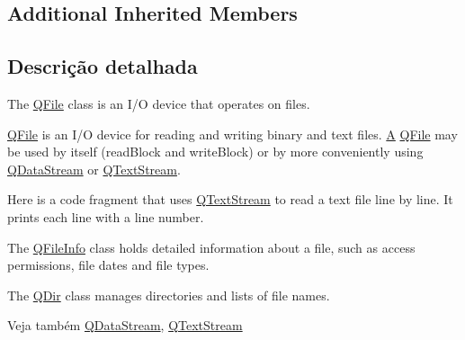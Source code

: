 \subsection*{Additional Inherited Members}


\subsection{Descrição detalhada}
The \hyperlink{class_q_file}{Q\-File} class is an I/\-O device that operates on files. 

\hyperlink{class_q_file}{Q\-File} is an I/\-O device for reading and writing binary and text files. \hyperlink{class_a}{A} \hyperlink{class_q_file}{Q\-File} may be used by itself (read\-Block and write\-Block) or by more conveniently using \hyperlink{class_q_data_stream}{Q\-Data\-Stream} or \hyperlink{class_q_text_stream}{Q\-Text\-Stream}.

Here is a code fragment that uses \hyperlink{class_q_text_stream}{Q\-Text\-Stream} to read a text file line by line. It prints each line with a line number. 


The \hyperlink{class_q_file_info}{Q\-File\-Info} class holds detailed information about a file, such as access permissions, file dates and file types.

The \hyperlink{class_q_dir}{Q\-Dir} class manages directories and lists of file names.

\begin{DoxySeeAlso}{Veja também}
\hyperlink{class_q_data_stream}{Q\-Data\-Stream}, \hyperlink{class_q_text_stream}{Q\-Text\-Stream} 
\end{DoxySeeAlso}


